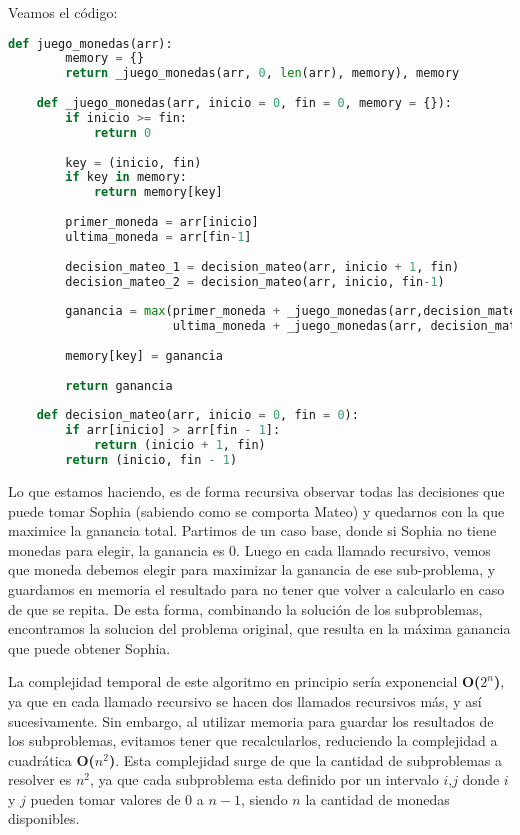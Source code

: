 Veamos el código:
\vskip0.25cm
\begin{lstlisting}[language=Python]
    def juego_monedas(arr):
        memory = {}
        return _juego_monedas(arr, 0, len(arr), memory), memory
    
    def _juego_monedas(arr, inicio = 0, fin = 0, memory = {}):
        if inicio >= fin:
            return 0
        
        key = (inicio, fin)
        if key in memory:
            return memory[key]
    
        primer_moneda = arr[inicio]
        ultima_moneda = arr[fin-1]
        
        decision_mateo_1 = decision_mateo(arr, inicio + 1, fin)
        decision_mateo_2 = decision_mateo(arr, inicio, fin-1)
    
        ganancia = max(primer_moneda + _juego_monedas(arr,decision_mateo_1[0],decision_mateo_1[1], memory), 
                       ultima_moneda + _juego_monedas(arr, decision_mateo_2[0], decision_mateo_2[1], memory))
        
        memory[key] = ganancia
    
        return ganancia
        
    def decision_mateo(arr, inicio = 0, fin = 0):
        if arr[inicio] > arr[fin - 1]:
            return (inicio + 1, fin)
        return (inicio, fin - 1)    
\end{lstlisting}
\vskip0.25cm
Lo que estamos haciendo, es de forma recursiva observar todas las decisiones que puede tomar Sophia (sabiendo como se comporta Mateo) y quedarnos con la que maximice la ganancia total. 
Partimos de un caso base, donde si Sophia no tiene monedas para elegir, la ganancia es 0.
Luego en cada llamado recursivo, vemos que moneda debemos elegir para maximizar la ganancia de ese sub-problema, y guardamos en memoria el resultado para no tener que volver a calcularlo en caso de que se repita. De esta forma, combinando la solución de los subproblemas, encontramos la solucion del problema original, que resulta en la máxima ganancia que puede obtener Sophia.


La complejidad temporal de este algoritmo en principio sería exponencial \textbf{O($2^n$)}, ya que en cada llamado recursivo se hacen dos llamados recursivos más, y así sucesivamente.
Sin embargo, al utilizar memoria para guardar los resultados de los subproblemas, evitamos tener que recalcularlos, reduciendo la complejidad a cuadrática \textbf{O($n^2$)}. Esta complejidad surge de que la cantidad de subproblemas a resolver es $n^2$, ya que cada subproblema esta definido por un intervalo $i$,$j$ donde $i$ y $j$ pueden tomar valores de 0 a $n-1$, siendo $n$ la cantidad de monedas disponibles.

